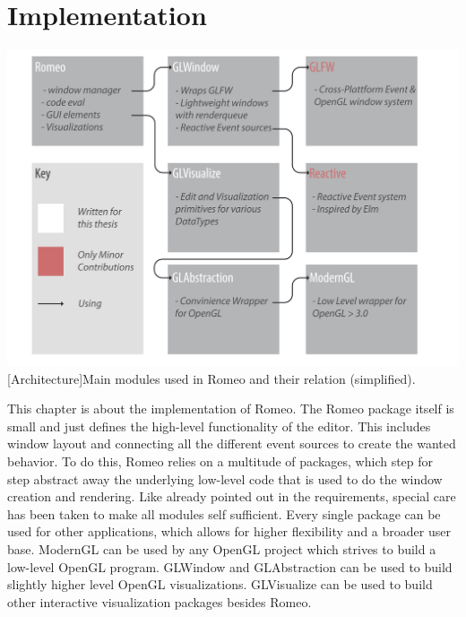 \section{Implementation}

\vspace{1em}
\begin{minipage}{\linewidth}
    \centering
    \includegraphics[width=0.9\linewidth]{graphics/architecture.pdf}
    [Architecture]{Main modules used in Romeo and their relation (simplified).}
    \label{fig:architecture} 
\end{minipage}


This chapter is about the implementation of Romeo.
The Romeo package itself is small and just defines the high-level functionality of the editor.
This includes window layout and connecting all the different event sources to create the wanted behavior.
To do this, Romeo relies on a multitude of packages, which step for step abstract away the underlying low-level code that is used to do the window creation and rendering. 
Like already pointed out in the requirements, special care has been taken to make all modules self sufficient. 
Every single package can be used for other applications, which allows for higher flexibility and a broader user base.
ModernGL can be used by any OpenGL project which strives to build a low-level OpenGL program.
GLWindow and GLAbstraction can be used to build slightly higher level OpenGL visualizations. 
GLVisualize can be used to build other interactive visualization packages besides Romeo.

